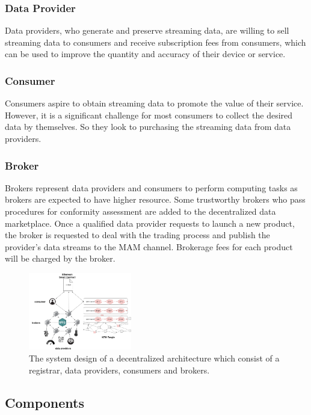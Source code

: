 \documentclass[journal,10pt,a4paper]{IEEEtran}
\begin{document}
\subsubsection{Data Provider}
Data providers, who generate and preserve streaming data, are willing to sell streaming data to consumers and receive subscription fees from consumers, which can be used to improve the quantity and accuracy of their device or service.

\subsubsection{Consumer}
Consumers aspire to obtain streaming data to promote the value of their service. However, it is a significant challenge for most consumers to collect the desired data by themselves. So they look to purchasing the streaming data from data providers.

\subsubsection{Broker}
Brokers represent data providers and consumers to perform computing tasks as brokers are expected to have higher resource. Some trustworthy brokers who pass procedures for conformity assessment are added to the decentralized data marketplace. Once a qualified data provider requests to launch a new product, the broker is requested to deal with the trading process and publish the provider’s data streams to the MAM channel. Brokerage fees for each product will be charged by the broker.

\begin{figure}[h]
    \centering
    \includegraphics[width=0.4\textwidth]{system_design}
    \caption{The system design of a decentralized architecture which consist of a registrar, data providers, consumers and brokers.}
    \label{fig:system_design}
\end{figure}

\subsection{Components}
\end{document}
